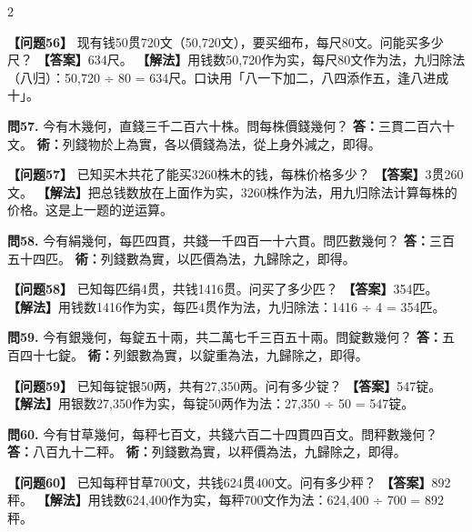 \documentclass[11pt,a4paper]{article}
\begin{document}
\begin{paracol}{2}
\switchcolumn

\textbf{【问题56】} 现有钱50贯720文（50,720文），要买细布，每尺80文。问能买多少尺？\break
\textbf{【答案】}634尺。\break
\textbf{【解法】}用钱数50,720作为实，每尺80文作为法，九归除法（八归）：50,720 ÷ 80 = 634尺。口诀用「八一下加二，八四添作五，逢八进成十」。

\switchcolumn*

\textbf{問57.} 今有木幾何，直錢三千二百六十株。問每株價錢幾何？\break
\textbf{答：}三貫二百六十文。\break
\textbf{術：}列錢物於上為實，各以價錢為法，從上身外減之，即得。

\switchcolumn

\textbf{【问题57】} 已知买木共花了能买3260株木的钱，每株价格多少？\break
\textbf{【答案】}3贯260文。\break
\textbf{【解法】}把总钱数放在上面作为实，3260株作为法，用九归除法计算每株的价格。这是上一题的逆运算。

\switchcolumn*

\textbf{問58.} 今有絹幾何，每匹四貫，共錢一千四百一十六貫。問匹數幾何？\break
\textbf{答：}三百五十四匹。\break
\textbf{術：}列錢數為實，以匹價為法，九歸除之，即得。

\switchcolumn

\textbf{【问题58】} 已知每匹绢4贯，共钱1416贯。问买了多少匹？\break
\textbf{【答案】}354匹。\break
\textbf{【解法】}用钱数1416作为实，每匹4贯作为法，九归除法：1416 ÷ 4 = 354匹。

\switchcolumn*

\textbf{問59.} 今有銀幾何，每錠五十兩，共二萬七千三百五十兩。問錠數幾何？\break
\textbf{答：}五百四十七錠。\break
\textbf{術：}列銀數為實，以錠重為法，九歸除之，即得。

\switchcolumn

\textbf{【问题59】} 已知每锭银50两，共有27,350两。问有多少锭？\break
\textbf{【答案】}547锭。\break
\textbf{【解法】}用银数27,350作为实，每锭50两作为法：27,350 ÷ 50 = 547锭。

\switchcolumn*

\textbf{問60.} 今有甘草幾何，每秤七百文，共錢六百二十四貫四百文。問秤數幾何？\break
\textbf{答：}八百九十二秤。\break
\textbf{術：}列錢數為實，以秤價為法，九歸除之，即得。

\switchcolumn

\textbf{【问题60】} 已知每秤甘草700文，共钱624贯400文。问有多少秤？\break
\textbf{【答案】}892秤。\break
\textbf{【解法】}用钱数624,400作为实，每秤700文作为法：624,400 ÷ 700 = 892秤。

\switchcolumn*


\end{paracol}
\end{document}
